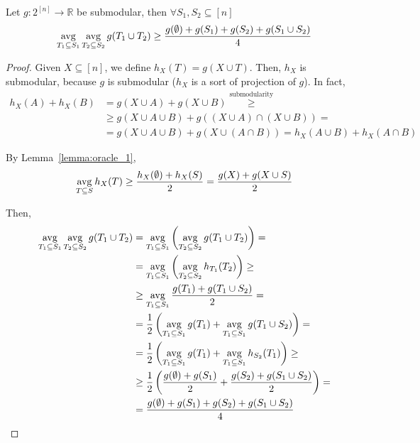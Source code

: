     \begin{lemma}\label{lemma:oracle_2}
        Let $g : 2^{[n]} \rightarrow \mathbb{R}$ be submodular, then $\forall S_1, S_2 \subseteq [n]$
        \[ \operatorname*{avg}_{T_1 \subseteq S_1} \operatorname*{avg}_{T_2 \subseteq S_2} g(T_1 \cup T_2) \geq \frac{g(\emptyset) + g(S_1) + g(S_2) + g(S_1 \cup S_2)}{4} \]
    \end{lemma}

    \begin{proof}
        Given $X \subseteq [n]$, we define $h_X(T) = g(X \cup T)$.
        Then, $h_X$ is submodular, because $g$ is submodular ($h_X$ is a sort of projection of $g$).
        In fact,
        \begin{equation*}
            \begin{split}
                h_X(A) + h_X(B) &= g(X \cup A) + g(X \cup B) \overset{\text{submodularity}}{\geq}\\
                    &\geq g(X \cup A \cup B) + g((X \cup A) \cap (X \cup B)) =\\
                    &= g(X \cup A \cup B) + g(X \cup (A \cap B)) = h_X(A \cup B) + h_X(A \cap B)
            \end{split}
        \end{equation*}

        By Lemma~\ref{lemma:oracle_1},
        \[ \operatorname*{avg}_{T \subseteq S} h_X(T) \geq \frac{h_X(\emptyset) + h_X(S)}{2} = \frac{g(X) + g(X \cup S)}{2} \]

        Then,
        \begin{equation*}
            \begin{split}
                \operatorname*{avg}_{T_1 \subseteq S_1} \operatorname*{avg}_{T_2 \subseteq S_2} g(T_1 \cup T_2) &= \operatorname*{avg}_{T_1 \subseteq S_1} \left( \operatorname*{avg}_{T_2 \subseteq S_2} g(T_1 \cup T_2) \right) =\\
                    &= \operatorname*{avg}_{T_1 \subseteq S_1} \left( \operatorname*{avg}_{T_2 \subseteq S_2} h_{T_1}(T_2) \right) \geq\\
                    &\geq \operatorname*{avg}_{T_1 \subseteq S_1} \frac{g(T_1) + g(T_1 \cup S_2)}{2} =\\
                    &= \frac{1}{2} \left( \operatorname*{avg}_{T_1 \subseteq S_1} g(T_1) + \operatorname*{avg}_{T_1 \subseteq S_1} g(T_1 \cup S_2) \right) =\\
                    &= \frac{1}{2} \left( \operatorname*{avg}_{T_1 \subseteq S_1} g(T_1) + \operatorname*{avg}_{T_1 \subseteq S_1} h_{S_2}(T_1) \right) \geq\\
                    &\geq \frac{1}{2} \left( \frac{g(\emptyset) + g(S_1)}{2} + \frac{g(S_2) + g(S_1 \cup S_2)}{2} \right) =\\
                    &= \frac{g(\emptyset) + g(S_1) + g(S_2) + g(S_1 \cup S_2)}{4}
            \end{split}
        \end{equation*}
    \end{proof}

